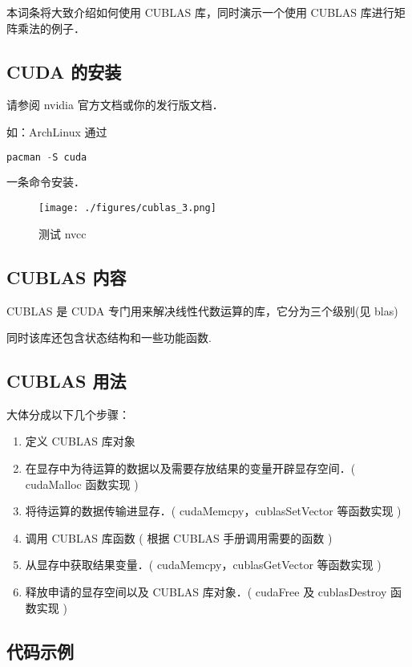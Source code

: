 
本词条将大致介绍如何使用 CUBLAS 库，同时演示一个使用 CUBLAS 库进行矩阵乘法的例子．
\subsection{CUDA 的安装}%
请参阅 nvidia 官方文档或你的发行版文档．

如：ArchLinux 通过
\begin{lstlisting}[language=cpp]
pacman -S cuda
\end{lstlisting}
一条命令安装．

\begin{figure}[ht]
\centering
\texttt{[image: ./figures/cublas\_3.png]}
\caption{测试 nvcc} \label{fig:cublas_3}
\end{figure}

\subsection{CUBLAS 内容}%

CUBLAS 是 CUDA 专门用来解决线性代数运算的库，它分为三个级别(见 blas)

同时该库还包含状态结构和一些功能函数.

\subsection{CUBLAS 用法}%

大体分成以下几个步骤：

\begin{enumerate}
  \item 定义 CUBLAS 库对象 
  \item  在显存中为待运算的数据以及需要存放结果的变量开辟显存空间．( cudaMalloc 函数实现 )
  \item  将待运算的数据传输进显存．( cudaMemcpy，cublasSetVector 等函数实现 )
  \item 调用 CUBLAS 库函数 ( 根据 CUBLAS 手册调用需要的函数 )
  \item 从显存中获取结果变量．( cudaMemcpy，cublasGetVector 等函数实现 )
  \item  释放申请的显存空间以及 CUBLAS 库对象．( cudaFree 及 cublasDestroy 函数实现 )
\end{enumerate}

\subsection{代码示例}%

